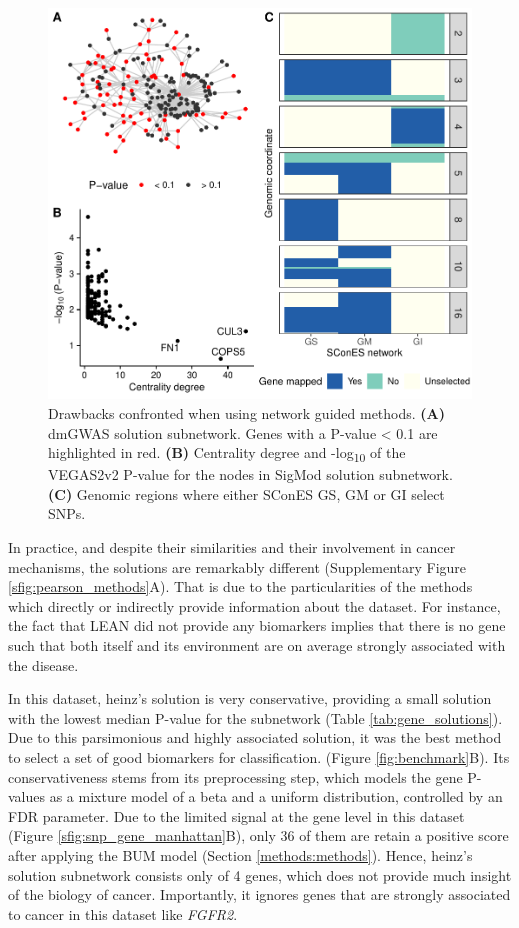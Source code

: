 \documentclass[twocolumn, 10pt]{article}
\begin{document}
\begin{figure}[htbp]
\centering
\includegraphics[width=.8\linewidth]{./figures/figure_2.pdf}
\caption{\label{fig:issues}
Drawbacks confronted when using network guided methods. \textbf{(A)} dmGWAS solution subnetwork. Genes with a P-value < 0.1 are highlighted in red. \textbf{(B)} Centrality degree and -log\textsubscript{10} of the VEGAS2v2 P-value for the nodes in SigMod solution subnetwork. \textbf{(C)} Genomic regions where either SConES GS, GM or GI select SNPs.}
\end{figure}

In practice, and despite their similarities and their involvement in cancer mechanisms, the solutions are remarkably different (Supplementary Figure \ref{sfig:pearson_methods}A). That is due to the particularities of the methods which directly or indirectly provide information about the dataset. For instance, the fact that LEAN did not provide any biomarkers implies that there is no gene such that both itself and its environment are on average strongly associated with the disease. 

In this dataset, heinz's solution is very conservative, providing a small solution with the lowest median P-value for the subnetwork (Table \ref{tab:gene_solutions}). Due to this parsimonious and highly associated solution, it was the best method to select a set of good biomarkers for classification. (Figure \ref{fig:benchmark}B). Its conservativeness stems from its preprocessing step, which models the gene P-values as a mixture model of a beta and a uniform distribution, controlled by an FDR parameter. Due to the limited signal at the gene level in this dataset (Figure \ref{sfig:snp_gene_manhattan}B), only 36 of them are retain a positive score after applying the BUM model (Section \ref{methods:methods}). Hence, heinz's solution subnetwork consists only of 4 genes, which does not provide much insight of the biology of cancer. Importantly, it ignores genes that are strongly associated to cancer in this dataset like \emph{FGFR2}. 
\end{document}

